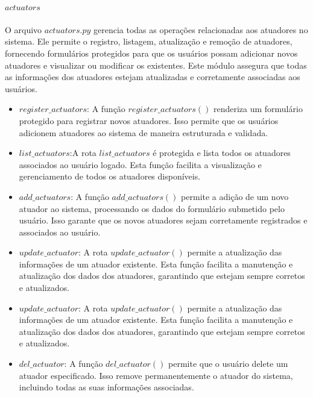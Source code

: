 \documentclass[conference, a4paper, 12pt]{IEEEtran}
\begin{document}
      \paragraph{$actuators$}
      O arquivo $actuators.py$ gerencia todas as operações relacionadas aos atuadores no sistema. Ele permite o registro, listagem, atualização e remoção de atuadores, fornecendo formulários protegidos para que os usuários possam adicionar novos atuadores e visualizar ou modificar os existentes. Este módulo assegura que todas as informações dos atuadores estejam atualizadas e corretamente associadas aos usuários.
      \begin{itemize}
          \item $register\_actuators$: A função $register\_actuators()$ renderiza um formulário protegido para registrar novos atuadores. Isso permite que os usuários adicionem atuadores ao sistema de maneira estruturada e validada.
      
          \item $list\_actuators$:A rota $list\_actuators$ é protegida e lista todos os atuadores associados ao usuário logado. Esta função facilita a visualização e gerenciamento de todos os atuadores disponíveis.
      
          \item $add\_actuators$: A função $add\_actuators()$ permite a adição de um novo atuador ao sistema, processando os dados do formulário submetido pelo usuário. Isso garante que os novos atuadores sejam corretamente registrados e associados ao usuário.
      
          \item $update\_actuator$: A rota $update\_actuator()$ permite a atualização das informações de um atuador existente. Esta função facilita a manutenção e atualização dos dados dos atuadores, garantindo que estejam sempre corretos e atualizados.
      
          \item $update\_actuator$: A rota $update\_actuator()$ permite a atualização das informações de um atuador existente. Esta função facilita a manutenção e atualização dos dados dos atuadores, garantindo que estejam sempre corretos e atualizados.
      
          \item $del\_actuator$: A função $del\_actuator()$ permite que o usuário delete um atuador especificado. Isso remove permanentemente o atuador do sistema, incluindo todas as suas informações associadas.
      \end{itemize}
      
\end{document}
